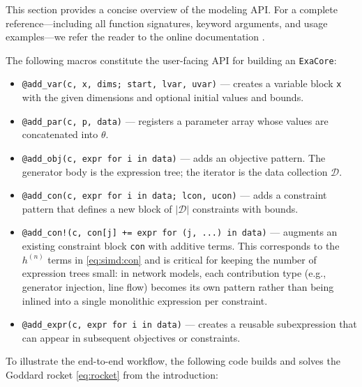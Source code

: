 \documentclass[11pt]{article}
\begin{document}
This section provides a concise overview of the modeling API. For a complete reference---including all function signatures, keyword arguments, and usage examples---we refer the reader to the online documentation \citep{shinExaModelsjl2025}.

The following macros constitute the user-facing API for building an \texttt{ExaCore}:
\begin{itemize}
  \item \texttt{@add\_var(c, x, dims; start, lvar, uvar)} --- creates a variable block \texttt{x} with the given dimensions and optional initial values and bounds.
  \item \texttt{@add\_par(c, p, data)} --- registers a parameter array whose values are concatenated into $\theta$.
  \item \texttt{@add\_obj(c, expr for i in data)} --- adds an objective pattern.  The generator body is the expression tree; the iterator is the data collection $\mathcal{D}$.
  \item \texttt{@add\_con(c, expr for i in data; lcon, ucon)} --- adds a constraint pattern that defines a new block of $|\mathcal{D}|$ constraints with bounds.
  \item \texttt{@add\_con!(c, con[j] += expr for (j, ...) in data)} --- augments an existing constraint block \texttt{con} with additive terms.  This corresponds to the $h^{(n)}$ terms in \cref{eq:simd:con} and is critical for keeping the number of expression trees small: in network models, each contribution type (e.g., generator injection, line flow) becomes its own pattern rather than being inlined into a single monolithic expression per constraint.
  \item \texttt{@add\_expr(c, expr for i in data)} --- creates a reusable subexpression that can appear in subsequent objectives or constraints.
\end{itemize}
To illustrate the end-to-end workflow, the following code builds and solves the Goddard rocket \cref{eq:rocket} from the introduction:
\end{document}
